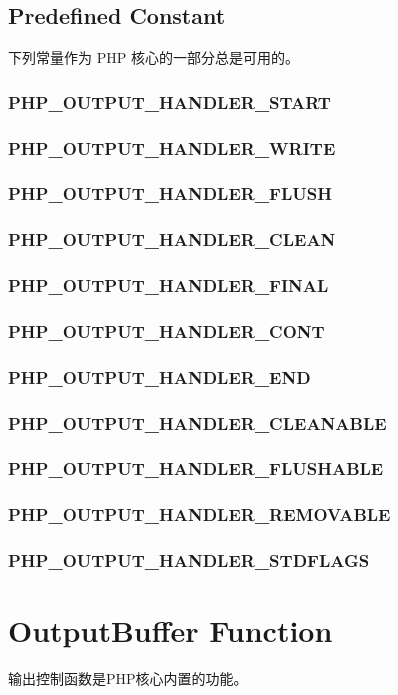 \section{Predefined Constant}


下列常量作为 PHP 核心的一部分总是可用的。


\subsection{PHP\_OUTPUT\_HANDLER\_START}


\subsection{PHP\_OUTPUT\_HANDLER\_WRITE}


\subsection{PHP\_OUTPUT\_HANDLER\_FLUSH}


\subsection{PHP\_OUTPUT\_HANDLER\_CLEAN}


\subsection{PHP\_OUTPUT\_HANDLER\_FINAL}


\subsection{PHP\_OUTPUT\_HANDLER\_CONT}


\subsection{PHP\_OUTPUT\_HANDLER\_END}


\subsection{PHP\_OUTPUT\_HANDLER\_CLEANABLE}


\subsection{PHP\_OUTPUT\_HANDLER\_FLUSHABLE}


\subsection{PHP\_OUTPUT\_HANDLER\_REMOVABLE}


\subsection{PHP\_OUTPUT\_HANDLER\_STDFLAGS}


\chapter{OutputBuffer Function}

输出控制函数是PHP核心内置的功能。





